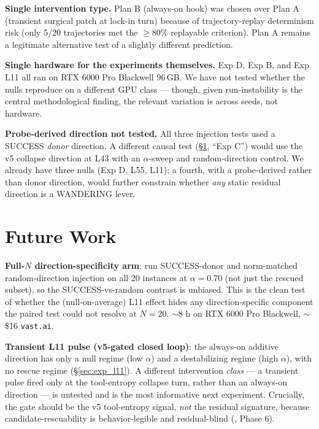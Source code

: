 \documentclass[11pt]{article}
\begin{document}
\textbf{Single intervention type.} Plan B (always-on hook) was chosen over Plan A (transient surgical patch at lock-in turn) because of trajectory-replay determinism risk (only 5/20 trajectories met the $\geq$80\% replayable criterion). Plan A remains a legitimate alternative test of a slightly different prediction.

\textbf{Single hardware for the experiments themselves.} Exp D, Exp B, and Exp L11 all ran on RTX 6000 Pro Blackwell 96\,GB. We have not tested whether the nulls reproduce on a different GPU class --- though, given run-instability is the central methodological finding, the relevant variation is across seeds, not hardware.

\textbf{Probe-derived direction not tested.} All three injection tests used a SUCCESS \emph{donor} direction. A different causal test (\S\ref{sec:future_work}, ``Exp C'') would use the v5 collapse direction at L43 with an $\alpha$-sweep and random-direction control. We already have three nulls (Exp D, L55, L11); a fourth, with a probe-derived rather than donor direction, would further constrain whether \emph{any} static residual direction is a WANDERING lever.

\section{Future Work}\label{sec:future_work}

\textbf{Full-$N$ direction-specificity arm}: run SUCCESS-donor and norm-matched random-direction injection on all 20 instances at $\alpha=0.70$ (not just the rescued subset), so the SUCCESS-vs-random contrast is unbiased. This is the clean test of whether the (null-on-average) L11 effect hides any direction-specific component the paired test could not resolve at $N=20$. $\sim$8 h on RTX 6000 Pro Blackwell, $\sim$\$16 \texttt{vast.ai}.

\textbf{Transient L11 pulse (v5-gated closed loop)}: the always-on additive direction has only a null regime (low $\alpha$) and a destabilizing regime (high $\alpha$), with no rescue regime (\S\ref{sec:exp_l11}). A different intervention \emph{class} --- a transient pulse fired only at the tool-entropy collapse turn, rather than an always-on direction --- is untested and is the most informative next experiment. Crucially, the gate should be the v5 tool-entropy signal, \emph{not} the residual signature, because candidate-rescuability is behavior-legible and residual-blind (\cite{multichannel_2026}, Phase 6).
\end{document}
